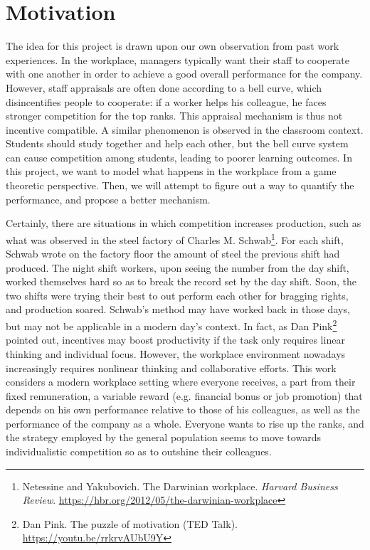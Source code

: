 \documentclass[10pt, a4paper]{article}
\begin{document}
	\section{Motivation}
	The idea for this project is drawn upon our own observation from past work experiences. In the workplace, managers typically want their staff to cooperate with one another in order to achieve a good overall performance for the company. However, staff appraisals are often done according to a bell curve, which disincentifies people to cooperate: if a worker helps his colleague, he faces stronger competition for the top ranks. This appraisal mechanism is thus not incentive compatible. A similar phenomenon is observed in the classroom context. Students should study together and help each other, but the bell curve system can cause competition among students, leading to poorer learning outcomes. In this project, we want to model what happens in the workplace from a game theoretic perspective. Then, we will attempt to figure out a way to quantify the performance, and propose a better mechanism. 
	
	Certainly, there are situations in which competition increases production, such as what was observed in the steel factory of Charles M. Schwab\footnote{Netessine and Yakubovich. The Darwinian workplace. \textit{Harvard Business Review}. \url{https://hbr.org/2012/05/the-darwinian-workplace}}. For each shift, Schwab wrote on the factory floor the amount of steel the previous shift had produced. The night shift workers, upon seeing the number from the day shift, worked themselves hard so as to break the record set by the day shift. Soon, the two shifts were trying their best to out perform each other for bragging rights, and production soared. Schwab's method may have worked back in those days, but may not be applicable in a modern day's context. In fact, as Dan Pink\footnote{Dan Pink. The puzzle of motivation (TED Talk). \url{https://youtu.be/rrkrvAUbU9Y}} pointed out, incentives may boost productivity if the task only requires linear thinking and individual focus. However, the workplace environment nowadays increasingly requires nonlinear thinking and collaborative efforts. This work considers a modern workplace setting where everyone receives, a part from their fixed remuneration, a variable reward (e.g. financial bonus or job promotion) that depends on his own performance relative to those of his colleagues, as well as the performance of the company as a whole. Everyone wants to rise up the ranks, and the strategy employed by the general population seems to move towards individualistic competition so as to outshine their colleagues.
	
\end{document}
